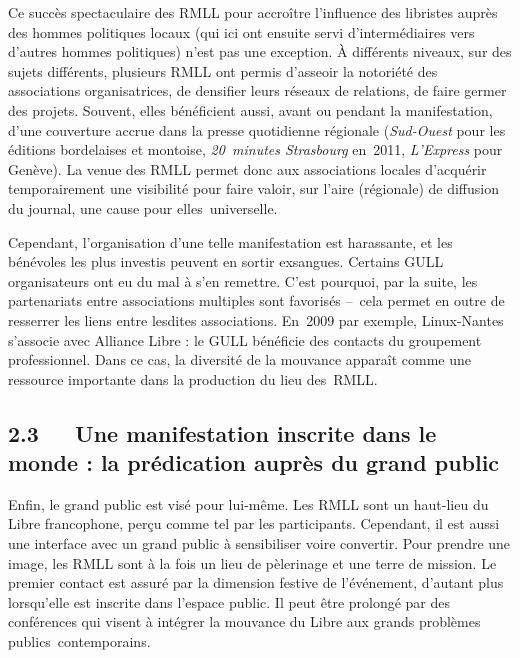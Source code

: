 \documentclass{FramateX}
\begin{document}
\begin{refsection}
Ce succès spectaculaire des RMLL pour accroître l'influence des
libristes auprès des hommes politiques locaux (qui ici ont ensuite
servi d'intermédiaires vers d'autres hommes politiques) n'est pas une
exception. À différents niveaux, sur des sujets différents, plusieurs
RMLL ont permis d'asseoir la notoriété des associations organisatrices,
de densifier leurs réseaux de relations, de faire germer des projets.
Souvent, elles bénéficient aussi, avant ou pendant la manifestation,
d'une couverture accrue dans la presse quotidienne régionale
(\textit{Sud-Ouest} pour les éditions bordelaises et montoise,
\textit{20~minutes Strasbourg} en~2011, \textit{L'Express} pour
Genève). La venue des RMLL permet donc aux associations locales
d'acquérir temporairement une visibilité pour faire valoir, sur l'aire
(régionale) de diffusion du journal, une cause pour elles~universelle.

Cependant, l'organisation d'une telle manifestation est harassante, et
les bénévoles les plus investis peuvent en sortir exsangues. Certains
GULL organisateurs ont eu du mal à s'en remettre. C'est pourquoi, par
la suite, les partenariats entre associations multiples sont favorisés
–~cela permet en outre de resserrer les liens entre lesdites
associations. En~2009 par exemple, Linux-Nantes s'associe avec Alliance
Libre : le GULL bénéficie des contacts du groupement professionnel.
Dans ce cas, la diversité de la mouvance apparaît comme une ressource
importante dans la production du lieu des~RMLL.

\subsection*{2.3~~~Une manifestation inscrite dans le monde : la prédication auprès du grand public}
{}

Enfin, le grand public est visé pour lui-même. Les RMLL sont un
haut-lieu du Libre francophone, perçu comme tel par les participants.
Cependant, il est aussi une interface avec un grand public à
sensibiliser voire convertir. Pour prendre une image, les RMLL sont à
la fois un lieu de pèlerinage et une terre de mission. Le premier
contact est assuré par la dimension festive de l'événement, d'autant
plus lorsqu'elle est inscrite dans l'espace public. Il peut être
prolongé par des conférences qui visent à intégrer la mouvance du Libre
aux grands problèmes publics~contemporains.


\end{refsection}
\end{document}
